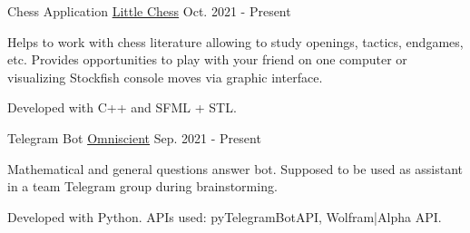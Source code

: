 

\begin{cventries}

  \cventry
    {\large Chess Application} %
    {\large \href{https://github.com/serhii-iljin/Little-Chess}{Little Chess}} %
    { } %
    {\large Oct. 2021 - Present} %
    {
      \begin{cvitems} %
        \item {\large Helps to work with chess literature allowing to study openings, tactics, endgames, etc. Provides opportunities to play with your friend on one computer or visualizing Stockfish console moves via graphic interface.}
        \item {\large Developed with C++ and SFML + STL.}
      \end{cvitems}
    }
 
    
   \cventry
    {\large Telegram Bot} %
    {\large \href{https://github.com/serhii-iljin/TELEGRAM_BOT_OMNISCIENT/tree/beta-1}{Omniscient}} %
    { } %
    {\large Sep. 2021 - Present} %
    {
      \begin{cvitems} %
        \item {\large Mathematical and general questions answer bot. Supposed to be used as assistant in a team Telegram group during brainstorming.}
        \item {\large Developed with Python. \newline APIs used: pyTelegramBotAPI, Wolfram|Alpha API.}
      \end{cvitems}
    }
\end{cventries}
